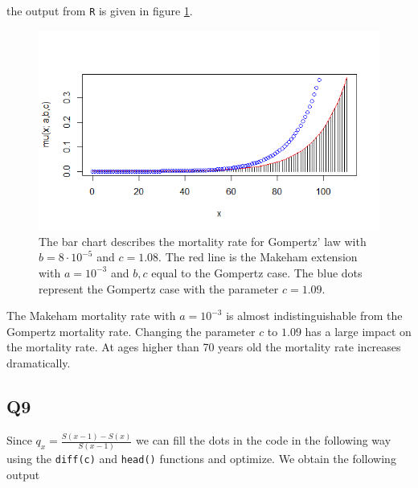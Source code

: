 the output from \verb|R| is given in figure \ref{Figure_Question8}.
\begin{center}
\begin{figure}[H]

\includegraphics[scale=1]{Question_8_MakehamGompertz.png}

\caption{The bar chart describes the mortality rate for Gompertz' law with $b = 8 \cdot 10^{-5}$ and $c=1.08$. The red line is the Makeham extension with $a=10^{-3}$ and $b,c$ equal to the Gompertz case. The blue dots represent the Gompertz case with the parameter $c = 1.09$.}
\label{Figure_Question8}

\end{figure}
\end{center}

The Makeham mortality rate with $a = 10^{-3}$ is almost indistinguishable from the Gompertz mortality rate. Changing the parameter $c$ to $1.09$ has a large impact on the mortality rate. At ages higher than 70 years old the mortality rate increases dramatically.


\subsection*{Q9}

Since $q_x = \frac{S(x-1) - S(x)}{S(x-1)}$ we can fill the dots in the code in the following way using the \verb+diff(c)+ and \verb+head()+ functions and optimize. We obtain the following output

